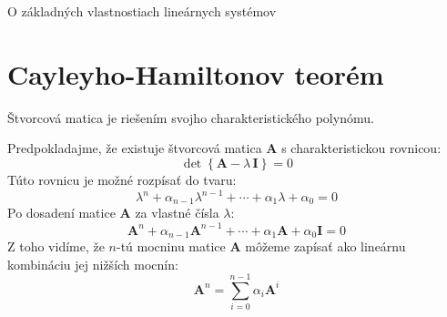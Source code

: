 \documentclass[a4paper, 10pt, ]{article}
\begin{document}
\begin{flushleft}
    O základných vlastnostiach lineárnych systémov
\end{flushleft}

\bigskip

\normalsize
\normalfont



\section{Cayleyho-Hamiltonov teorém}

\begin{theorem}
    Štvorcová matica je riešením svojho charakteristického polynómu.

    \noindent Predpokladajme, že existuje štvorcová matica $\bm{A}$ s charakteristickou rovnicou:
    \begin{equation}
        \det \left\{ \bm{A} - \lambda \, \bm{I} \right\} = 0
    \end{equation}
    Túto rovnicu je možné rozpísať do tvaru:
    \begin{equation}
        \lambda^n + \alpha_{n - 1} \lambda^{n - 1} + \cdots + \alpha_{1} \lambda + \alpha_{0} = 0
    \end{equation}
    Po dosadení matice $\bm{A}$ za vlastné čísla $\lambda$:
    \begin{equation}
        \bm{A}^n + \alpha_{n - 1} \bm{A}^{n - 1} + \cdots + \alpha_{1} \bm{A} + \alpha_{0} \bm{I} = 0
    \end{equation}
    Z toho vidíme, že $n$-tú mocninu matice $\bm{A}$ môžeme zapísať	ako lineárnu kombináciu jej nižších mocnín:
    \begin{equation}
        \bm{A}^n = \sum_{i = 0}^{n - 1} \alpha_{i} \bm{A}^{i}
    \end{equation}
\end{theorem}
\end{document}
